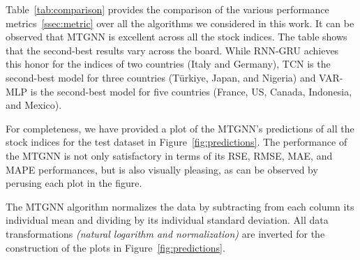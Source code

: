 Table~\ref{tab:comparison} provides the comparison of the various performance
metrics~\ref{ssec:metric} over all the algorithms we considered in this work. It
can be observed that MTGNN is excellent across all the stock indices. The table
shows that the second-best results vary across the board. While RNN-GRU achieves
this honor for the indices of two countries (Italy and Germany), TCN is the
second-best model for three countries (T\"{u}rkiye, Japan, and Nigeria) and
VAR-MLP is the second-best model for five countries (France, US, Canada,
Indonesia, and Mexico). 

For completeness, we have provided a plot of the MTGNN's predictions of all the
stock indices for the test dataset in Figure~\ref{fig:predictions}. The
performance of the MTGNN is not only satisfactory in terms of its RSE, RMSE,
MAE, and MAPE performances, but is also visually pleasing, as can be observed by
perusing each plot in the figure. 

\begin{rem}
The MTGNN algorithm normalizes the data by subtracting from each column its individual mean and dividing by its individual standard deviation. All data transformations \textit{(natural logarithm and normalization)} are inverted for the construction of the plots in Figure~\ref{fig:predictions}.
\end{rem}

